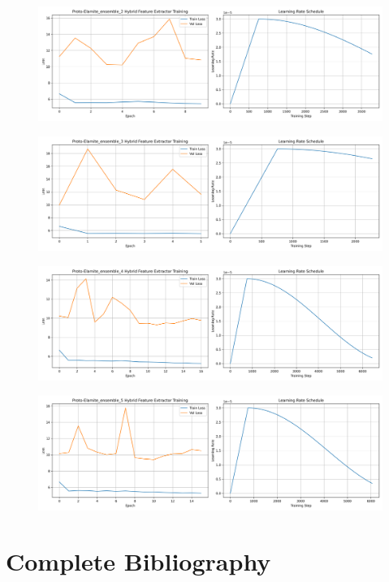 \documentclass[11pt,a4paper,oneside]{report}
\begin{document}
 \begin{figure}[H]
    \centering
    \includegraphics[width=1\linewidth]{Visualizations/Training/Proto-Elamite/Proto-Elamite_ensemble_2_hybrid_extractor_history.png}
\end{figure}
 \begin{figure}[H]
    \centering
    \includegraphics[width=1\linewidth]{Visualizations/Training/Proto-Elamite/Proto-Elamite_ensemble_3_hybrid_extractor_history.png}
\end{figure}
 \begin{figure}[H]
    \centering
    \includegraphics[width=1\linewidth]{Visualizations/Training/Proto-Elamite/Proto-Elamite_ensemble_4_hybrid_extractor_history.png}
\end{figure}
 \begin{figure}[H]
    \centering
    \includegraphics[width=1\linewidth]{Visualizations/Training/Proto-Elamite/Proto-Elamite_ensemble_5_hybrid_extractor_history.png}
\end{figure}

\clearpage 
\section{Complete Bibliography}
\nocite{*}
\printbibliography[heading=none, notcategory=cited]
\end{document}
